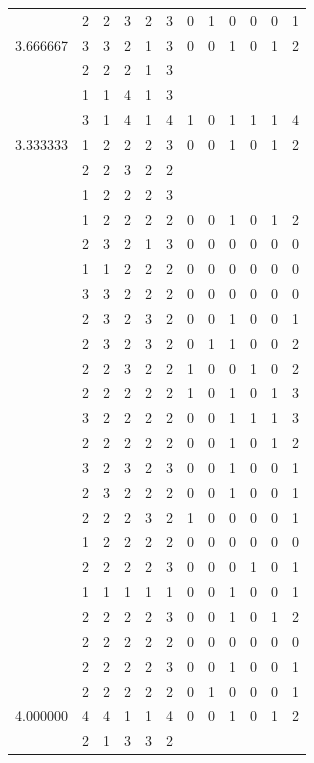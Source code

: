 \documentclass[]{book}
\theoremstyle{definition}
\theoremstyle{definition}
\theoremstyle{definition}
\theoremstyle{remark}
\begin{document}
\begin{table}
{\begin{tabular}[t]{rrrrrrrrrrrr}
 & 2 & 2 & 3 & 2 & 3 & 0 & 1 & 0 & 0 & 0 & 1\\
3.666667 & 3 & 3 & 2 & 1 & 3 & 0 & 0 & 1 & 0 & 1 & 2\\
 & 2 & 2 & 2 & 1 & 3 &  &  &  &  &  & \\
 & 1 & 1 & 4 & 1 & 3 &  &  &  &  &  & \\
 & 3 & 1 & 4 & 1 & 4 & 1 & 0 & 1 & 1 & 1 & 4\\
3.333333 & 1 & 2 & 2 & 2 & 3 & 0 & 0 & 1 & 0 & 1 & 2\\
 & 2 & 2 & 3 & 2 & 2 &  &  &  &  &  & \\
 & 1 & 2 & 2 & 2 & 3 &  &  &  &  &  & \\
 & 1 & 2 & 2 & 2 & 2 & 0 & 0 & 1 & 0 & 1 & 2\\
 & 2 & 3 & 2 & 1 & 3 & 0 & 0 & 0 & 0 & 0 & 0\\
 & 1 & 1 & 2 & 2 & 2 & 0 & 0 & 0 & 0 & 0 & 0\\
 & 3 & 3 & 2 & 2 & 2 & 0 & 0 & 0 & 0 & 0 & 0\\
 & 2 & 3 & 2 & 3 & 2 & 0 & 0 & 1 & 0 & 0 & 1\\
 & 2 & 3 & 2 & 3 & 2 & 0 & 1 & 1 & 0 & 0 & 2\\
 & 2 & 2 & 3 & 2 & 2 & 1 & 0 & 0 & 1 & 0 & 2\\
 & 2 & 2 & 2 & 2 & 2 & 1 & 0 & 1 & 0 & 1 & 3\\
 & 3 & 2 & 2 & 2 & 2 & 0 & 0 & 1 & 1 & 1 & 3\\
 & 2 & 2 & 2 & 2 & 2 & 0 & 0 & 1 & 0 & 1 & 2\\
 & 3 & 2 & 3 & 2 & 3 & 0 & 0 & 1 & 0 & 0 & 1\\
 & 2 & 3 & 2 & 2 & 2 & 0 & 0 & 1 & 0 & 0 & 1\\
 & 2 & 2 & 2 & 3 & 2 & 1 & 0 & 0 & 0 & 0 & 1\\
 & 1 & 2 & 2 & 2 & 2 & 0 & 0 & 0 & 0 & 0 & 0\\
 & 2 & 2 & 2 & 2 & 3 & 0 & 0 & 0 & 1 & 0 & 1\\
 & 1 & 1 & 1 & 1 & 1 & 0 & 0 & 1 & 0 & 0 & 1\\
 & 2 & 2 & 2 & 2 & 3 & 0 & 0 & 1 & 0 & 1 & 2\\
 & 2 & 2 & 2 & 2 & 2 & 0 & 0 & 0 & 0 & 0 & 0\\
 & 2 & 2 & 2 & 2 & 3 & 0 & 0 & 1 & 0 & 0 & 1\\
 & 2 & 2 & 2 & 2 & 2 & 0 & 1 & 0 & 0 & 0 & 1\\
4.000000 & 4 & 4 & 1 & 1 & 4 & 0 & 0 & 1 & 0 & 1 & 2\\
 & 2 & 1 & 3 & 3 & 2 &  &  &  &  &  & \\

\end{tabular}}
\end{table}
\end{document}
